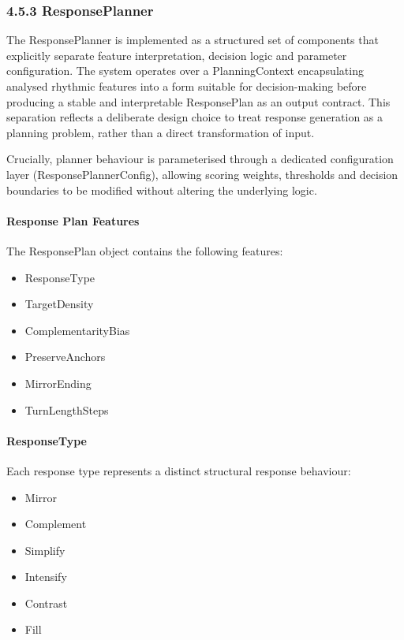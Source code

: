 \subsubsection{4.5.3 ResponsePlanner}\label{responseplanner}

The ResponsePlanner is implemented as a structured set of components
that explicitly separate feature interpretation, decision logic and
parameter configuration. The system operates over a PlanningContext
encapsulating analysed rhythmic features into a form suitable for
decision-making before producing a stable and interpretable ResponsePlan
as an output contract. This separation reflects a deliberate design
choice to treat response generation as a planning problem, rather than a
direct transformation of input.

Crucially, planner behaviour is parameterised through a dedicated
configuration layer (ResponsePlannerConfig), allowing scoring weights,
thresholds and decision boundaries to be modified without altering the
underlying logic.

\paragraph{Response Plan Features}\label{response-plan-features}

The ResponsePlan object contains the following features:

\begin{itemize}
\item
  ResponseType
\item
  TargetDensity
\item
  ComplementarityBias
\item
  PreserveAnchors
\item
  MirrorEnding
\item
  TurnLengthSteps
\end{itemize}

\paragraph{ResponseType}\label{responsetype}

Each response type represents a distinct structural response behaviour:

\begin{itemize}
\item
  Mirror
\item
  Complement
\item
  Simplify
\item
  Intensify
\item
  Contrast
\item
  Fill
\end{itemize}

